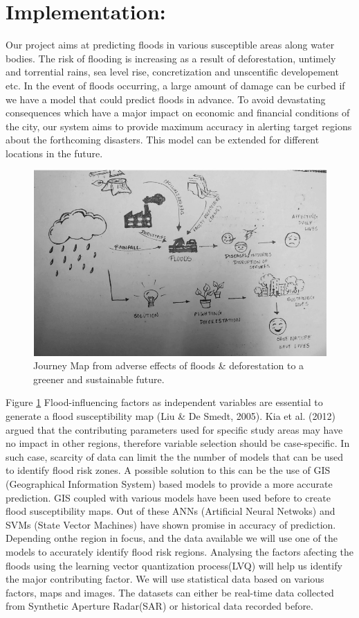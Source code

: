 \documentclass{article}
\begin{document}
	\section*{Implementation:}
		Our project aims at predicting floods in various susceptible areas along water bodies. The risk of flooding is increasing as a result of deforestation, untimely and torrential rains, sea level rise, concretization and unscentific developement etc. In the event of floods occurring, a large amount of damage can be curbed if we have a model that could predict floods in advance. To avoid devastating consequences which have a major impact on economic and financial conditions of the city, our system aims to provide maximum accuracy in alerting target regions about the forthcoming disasters. This model can be extended for different locations in the future.
    \begin{figure}[h]
	    \includegraphics[width=\linewidth]{journeymap.png}
	    \caption{Journey Map from adverse effects of floods \& deforestation to a greener and sustainable future.}
	    \label{fig:map}
    \end{figure}

Figure \ref{fig:map}
Flood-influencing factors as independent variables are essential to generate a flood susceptibility map (Liu \& De Smedt, 2005). Kia et al. (2012) argued that the contributing parameters used for specific study areas may have no impact in other regions, therefore variable selection should be case-specific. In such case, scarcity of data can limit the the number of models that can be used to identify flood risk zones. A possible solution to this can be the use of GIS (Geographical Information System) based models to provide a more accurate prediction.  GIS coupled with various models have been used before to create flood susceptibility maps. Out of these ANNs (Artificial Neural Netwoks) and SVMs (State Vector Machines) have shown promise in accuracy of prediction. Depending onthe region in focus, and the data available we will use one of the models to accurately identify flood risk regions. Analysing the factors afecting the floods using the learning vector quantization process(LVQ) will help us identify the major contributing factor. 
We will use statistical data based on various factors, maps and images. The datasets can either be real-time data collected from Synthetic Aperture Radar(SAR) or historical data recorded before.   
\end{document}

